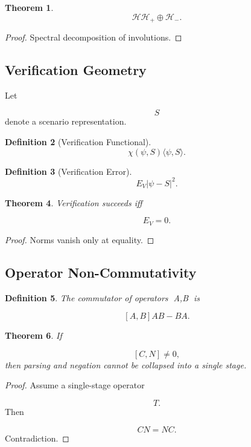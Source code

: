 \documentclass[12pt]{article}
\newtheorem{theorem}{Theorem}[section]
\newtheorem{definition}[theorem]{Definition}
\theoremstyle{remark}
\begin{document}
\begin{theorem}
\[
\mathcal H
\mathcal H_+
\oplus
\mathcal H_-.
\]
\end{theorem}

\begin{proof}
Spectral decomposition of involutions.
\end{proof}

\subsection{Verification Geometry}

Let

\[
S
\]
denote a scenario representation.

\begin{definition}[Verification Functional]
\[
\chi(\psi,S)
\langle\psi,S\rangle.
\]
\end{definition}

\begin{definition}[Verification Error]
\[
E_V
|\psi-S|^2.
\]
\end{definition}

\begin{theorem}
Verification succeeds iff

\[
E_V=0.
\]
\end{theorem}
\begin{proof}
Norms vanish only at equality.
\end{proof}

\subsection{Operator Non-Commutativity}

\begin{definition}
The commutator of operators A,B is

\[
[A,B]
AB-BA.
\]
\end{definition}

\begin{theorem}
If

\[
[C,N]\neq0,
\]
then parsing and negation cannot be collapsed into a single stage.
\end{theorem}

\begin{proof}
Assume a single-stage operator

\[
T.
\]
Then

\[
CN=NC.
\]
Contradiction.
\end{proof}
\end{document}
